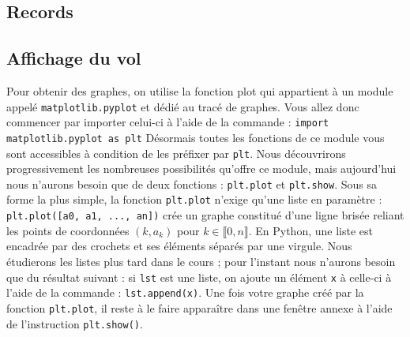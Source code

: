 \subsection*{Records}




\subsection*{Affichage du vol}

Pour obtenir des graphes, on utilise la fonction plot qui appartient à un module appelé
\texttt{matplotlib.pyplot} et dédié au tracé de graphes. Vous allez donc commencer par importer celui-ci à l’aide de la
commande :
\texttt{import matplotlib.pyplot as plt}
Désormais toutes les fonctions de ce module vous sont accessibles à condition de les préfixer par \texttt{plt}. Nous découvrirons
progressivement les nombreuses possibilités qu’offre ce module, mais aujourd’hui nous n’aurons besoin que de deux
fonctions : \texttt{plt.plot} et \texttt{plt.show}.
Sous sa forme la plus simple, la fonction \texttt{plt.plot} n’exige qu’une liste en paramètre : \texttt{plt.plot([a0, a1, ..., an])}
crée un graphe constitué d’une ligne brisée reliant les points de coordonnées $(k,a_k
)$ pour $k \in  \llbracket 0,n \rrbracket$.
En Python, une liste est encadrée par des crochets et ses éléments séparés par une virgule. Nous étudierons les listes plus
tard dans le cours ; pour l’instant nous n’aurons besoin que du résultat suivant : si \texttt{lst} est une liste, on ajoute un élément
\texttt{x} à celle-ci à l’aide de la commande : \texttt{lst.append(x)}.
Une fois votre graphe créé par la fonction \texttt{plt.plot}, il reste à le faire apparaître dans une fenêtre annexe à l’aide de
l’instruction \texttt{plt.show()}.



